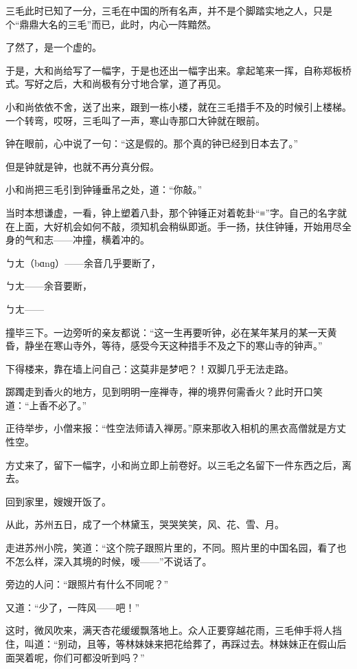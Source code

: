\par 三毛此时已知了一分，三毛在中国的所有名声，并不是个脚踏实地之人，只是个“鼎鼎大名的三毛”而已，此时，内心一阵黯然。
\par 了然了，是一个虚的。
\par 于是，大和尚给写了一幅字，于是也还出一幅字出来。拿起笔来一挥，自称郑板桥式。写好之后，大和尚极有分寸地合掌，道了再见。
\par 小和尚依依不舍，送了出来，跟到一栋小楼，就在三毛措手不及的时候引上楼梯。一个转弯，哎呀，三毛叫了一声，寒山寺那口大钟就在眼前。
\par 钟在眼前，心中说了一句：“这是假的。那个真的钟已经到日本去了。”
\par 但是钟就是钟，也就不再分真分假。
\par 小和尚把三毛引到钟锤垂吊之处，道：“你敲。”
\par 当时本想谦虚，一看，钟上塑着八卦，那个钟锤正对着乾卦“≡”字。自己的名字就在上面，大好机会如何不敲，须知机会稍纵即逝。手一扬，扶住钟锤，开始用尽全身的气和志——冲撞，横着冲的。
\par ㄅㄤ（bɑnɡ）——余音几乎要断了，
\par ㄅㄤ——余音要断，
\par ㄅㄤ——
\par 撞毕三下。一边旁听的亲友都说：“这一生再要听钟，必在某年某月的某一天黄昏，静坐在寒山寺外，等待，感受今天这种措手不及之下的寒山寺的钟声。”
\par 下得楼来，靠在墙上问自己：这莫非是梦吧？！双脚几乎无法走路。
\par 踯躅走到香火的地方，见到明明一座禅寺，禅的境界何需香火？此时开口笑道：“上香不必了。”
\par 正待举步，小僧来报：“性空法师请入禅房。”原来那收入相机的黑衣高僧就是方丈性空。
\par 方丈来了，留下一幅字，小和尚立即上前卷好。以三毛之名留下一件东西之后，离去。
\par 回到家里，嫂嫂开饭了。
\par 从此，苏州五日，成了一个林黛玉，哭哭笑笑，风、花、雪、月。
\par 走进苏州小院，笑道：“这个院子跟照片里的，不同。照片里的中国名园，看了也不怎么样，深入其境的时候，嗳——”不说话了。
\par 旁边的人问：“跟照片有什么不同呢？”
\par 又道：“少了，一阵风——吧！”
\par 这时，微风吹来，满天杏花缓缓飘落地上。众人正要穿越花雨，三毛伸手将人挡住，叫道：“别动，且等，等林妹妹来把花给葬了，再踩过去。林妹妹正在假山后面哭着呢，你们可都没听到吗？”

